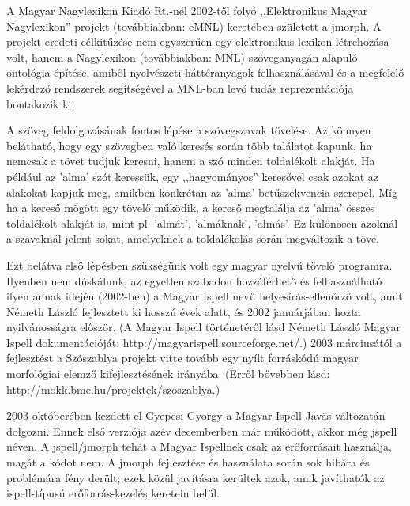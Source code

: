 \documentclass{article}
\begin{document}
A Magyar Nagylexikon Kiad\'o Rt.-n\'el 2002-t\H{o}l foly\'o ,,Elektronikus Magyar Nagylexikon'' projekt (tov\'abbiakban: eMNL) keret\'eben sz\"uletett a jmorph. A projekt eredeti c\'elkit\H{u}z\'ese nem egyszer\H{u}en egy elektronikus lexikon l\'etrehoz\'asa volt, hanem a Nagylexikon (tov\'abbiakban: MNL) sz\"oveganyag\'an alapul\'o ontol\'ogia \'ep\'{i}t\'ese, amib\H{o}l nyelv\'eszeti h\'att\'eranyagok felhaszn\'al\'as\'aval \'es a megfelel\H{o} lek\'erdez\H{o} rendszerek seg\'{i}ts\'eg\'evel a MNL-ban lev\H{o} tud\'as reprezent\'aci\'oja bontakozik ki. \par
A sz\"oveg feldolgoz\'as\'anak fontos l\'ep\'ese a sz\"ovegszavak t\"ovel\"ese. Az k\"onnyen bel\'athat\'o, hogy egy sz\"ovegben val\'o keres\'es sor\'an t\"obb tal\'alatot kapunk, ha nemcsak a t\"ovet tudjuk keresni, hanem a sz\'o minden toldal\'ekolt alakj\'at. Ha p\'eld\'aul az 'alma' sz\'ot keress\"uk, egy ,,hagyom\'anyos'' keres\H{o}vel csak azokat az alakokat kapjuk meg, amikben konkr\'etan az 'alma' betűszekvencia szerepel. M\'{i}g ha a keres\H{o} m\"og\"ott egy t\"ovel\H{o} m\H{u}k\"odik, a keres\H{o} megtal\'alja az 'alma' \"osszes toldal\'ekolt alakj\'at is, mint pl. 'alm\'at', 'alm\'aknak', 'alm\'as'. Ez k\"ul\"on\"osen azokn\'al a szavakn\'al jelent sokat, amelyeknek a toldal\'ekol\'as sor\'an megv\'altozik a t\"ove. \par
Ezt bel\'atva els\H{o} l\'ep\'esben sz\"uks\'eg\"unk volt egy magyar nyelv\H{u} t\"ovel\H{o} programra. Ilyenben nem d\'usk\'alunk, az egyetlen szabadon hozz\'af\'erhet\H{o} \'es felhaszn\'alhat\'o ilyen annak idej\'en (2002-ben) a Magyar Ispell nev\H{u} helyes\'{i}r\'as-ellen\H{o}rz\H{o} volt, amit N\'emeth L\'aszl\'o fejlesztett ki hossz\'u \'evek alatt, \'es 2002 janu\'arj\'aban hozta nyilv\'anoss\'agra el\H{o}sz\"or. (A Magyar Ispell t\"ort\'enet\'er\H{o}l l\'asd N\'emeth L\'aszl\'o Magyar Ispell dokument\'aci\'oj\'at: \mbox{http://magyarispell.sourceforge.net/}.) 2003 m\'arcius\'at\'ol a fejleszt\'est a Sz\'oszablya projekt vitte tov\'abb egy ny\'{i}lt forr\'ask\'od\'u magyar morfol\'ogiai elemz\H{o} kifejleszt\'es\'enek ir\'any\'aba. (Err\H{o}l b\H{o}vebben l\'asd: \mbox{http://mokk.bme.hu/projektek/szoszablya}.)  \par
2003 okt\'ober\'eben kezdett el Gyepesi Gy\"orgy a Magyar Ispell Javás v\'altozat\'an dolgozni. Ennek els\H{o} verzi\'oja az\'ev decemberben m\'ar m\H{u}k\"od\"ott, akkor m\'eg jspell n\'even. A jspell/jmorph teh\'at a Magyar Ispellnek csak az er\H{o}forr\'asait haszn\'alja, mag\'at a k\'odot nem. A jmorph fejleszt\'ese \'es haszn\'alata sor\'an sok hib\'ara \'es probl\'em\'ara f\'eny der\"ult; ezek k\"oz\"ul jav\'{i}t\'asra ker\"ultek azok, amik jav\'{i}that\'ok az ispell-t\'{i}pus\'u er\H{o}forr\'as-kezel\'es keretein bel\"ul. \par
\end{document}
